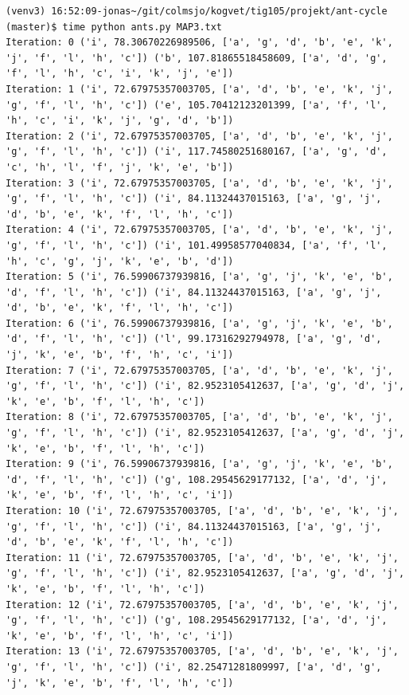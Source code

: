 \documentclass[11pt]{article}
\begin{document}
\begin{lstlisting}
(venv3) 16:52:09-jonas~/git/colmsjo/kogvet/tig105/projekt/ant-cycle (master)$ time python ants.py MAP3.txt
Iteration: 0 ('i', 78.30670226989506, ['a', 'g', 'd', 'b', 'e', 'k', 'j', 'f', 'l', 'h', 'c']) ('b', 107.81865518458609, ['a', 'd', 'g', 'f', 'l', 'h', 'c', 'i', 'k', 'j', 'e'])
Iteration: 1 ('i', 72.67975357003705, ['a', 'd', 'b', 'e', 'k', 'j', 'g', 'f', 'l', 'h', 'c']) ('e', 105.70412123201399, ['a', 'f', 'l', 'h', 'c', 'i', 'k', 'j', 'g', 'd', 'b'])
Iteration: 2 ('i', 72.67975357003705, ['a', 'd', 'b', 'e', 'k', 'j', 'g', 'f', 'l', 'h', 'c']) ('i', 117.74580251680167, ['a', 'g', 'd', 'c', 'h', 'l', 'f', 'j', 'k', 'e', 'b'])
Iteration: 3 ('i', 72.67975357003705, ['a', 'd', 'b', 'e', 'k', 'j', 'g', 'f', 'l', 'h', 'c']) ('i', 84.11324437015163, ['a', 'g', 'j', 'd', 'b', 'e', 'k', 'f', 'l', 'h', 'c'])
Iteration: 4 ('i', 72.67975357003705, ['a', 'd', 'b', 'e', 'k', 'j', 'g', 'f', 'l', 'h', 'c']) ('i', 101.49958577040834, ['a', 'f', 'l', 'h', 'c', 'g', 'j', 'k', 'e', 'b', 'd'])
Iteration: 5 ('i', 76.59906737939816, ['a', 'g', 'j', 'k', 'e', 'b', 'd', 'f', 'l', 'h', 'c']) ('i', 84.11324437015163, ['a', 'g', 'j', 'd', 'b', 'e', 'k', 'f', 'l', 'h', 'c'])
Iteration: 6 ('i', 76.59906737939816, ['a', 'g', 'j', 'k', 'e', 'b', 'd', 'f', 'l', 'h', 'c']) ('l', 99.17316292794978, ['a', 'g', 'd', 'j', 'k', 'e', 'b', 'f', 'h', 'c', 'i'])
Iteration: 7 ('i', 72.67975357003705, ['a', 'd', 'b', 'e', 'k', 'j', 'g', 'f', 'l', 'h', 'c']) ('i', 82.9523105412637, ['a', 'g', 'd', 'j', 'k', 'e', 'b', 'f', 'l', 'h', 'c'])
Iteration: 8 ('i', 72.67975357003705, ['a', 'd', 'b', 'e', 'k', 'j', 'g', 'f', 'l', 'h', 'c']) ('i', 82.9523105412637, ['a', 'g', 'd', 'j', 'k', 'e', 'b', 'f', 'l', 'h', 'c'])
Iteration: 9 ('i', 76.59906737939816, ['a', 'g', 'j', 'k', 'e', 'b', 'd', 'f', 'l', 'h', 'c']) ('g', 108.29545629177132, ['a', 'd', 'j', 'k', 'e', 'b', 'f', 'l', 'h', 'c', 'i'])
Iteration: 10 ('i', 72.67975357003705, ['a', 'd', 'b', 'e', 'k', 'j', 'g', 'f', 'l', 'h', 'c']) ('i', 84.11324437015163, ['a', 'g', 'j', 'd', 'b', 'e', 'k', 'f', 'l', 'h', 'c'])
Iteration: 11 ('i', 72.67975357003705, ['a', 'd', 'b', 'e', 'k', 'j', 'g', 'f', 'l', 'h', 'c']) ('i', 82.9523105412637, ['a', 'g', 'd', 'j', 'k', 'e', 'b', 'f', 'l', 'h', 'c'])
Iteration: 12 ('i', 72.67975357003705, ['a', 'd', 'b', 'e', 'k', 'j', 'g', 'f', 'l', 'h', 'c']) ('g', 108.29545629177132, ['a', 'd', 'j', 'k', 'e', 'b', 'f', 'l', 'h', 'c', 'i'])
Iteration: 13 ('i', 72.67975357003705, ['a', 'd', 'b', 'e', 'k', 'j', 'g', 'f', 'l', 'h', 'c']) ('i', 82.25471281809997, ['a', 'd', 'g', 'j', 'k', 'e', 'b', 'f', 'l', 'h', 'c'])

\end{lstlisting}
\end{document}

